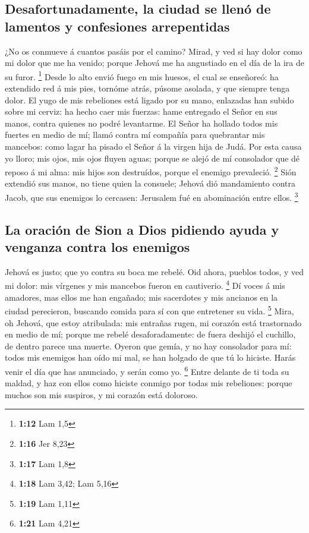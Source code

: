 \hypertarget{desafortunadamente-la-ciudad-se-llenuxf3-de-lamentos-y-confesiones-arrepentidas}{%
\subsection{Desafortunadamente, la ciudad se llenó de lamentos y
confesiones
arrepentidas}\label{desafortunadamente-la-ciudad-se-llenuxf3-de-lamentos-y-confesiones-arrepentidas}}

 ¿No os conmueve á cuantos pasáis por el camino? Mirad, y
ved si hay dolor como mi dolor que me ha venido; porque Jehová me ha
angustiado en el día de la ira de su furor. \footnote{\textbf{1:12} Lam
  1,5}  Desde lo alto envió fuego en mis huesos, el cual se
enseñoreó: ha extendido red á mis pies, tornóme atrás, púsome asolada, y
que siempre tenga dolor.  El yugo de mis rebeliones está
ligado por su mano, enlazadas han subido sobre mi cerviz: ha hecho caer
mis fuerzas: hame entregado el Señor en sus manos, contra quienes no
podré levantarme.  El Señor ha hollado todos mis fuertes en
medio de mí; llamó contra mí compañía para quebrantar mis mancebos: como
lagar ha pisado el Señor á la virgen hija de Judá.  Por
esta causa yo lloro; mis ojos, mis ojos fluyen aguas; porque se alejó de
mí consolador que dé reposo á mi alma: mis hijos son destruídos, porque
el enemigo prevaleció. \footnote{\textbf{1:16} Jer 8,23} 
Sión extendió sus manos, no tiene quien la consuele; Jehová dió
mandamiento contra Jacob, que sus enemigos lo cercasen: Jerusalem fué en
abominación entre ellos. \footnote{\textbf{1:17} Lam 1,8}

\hypertarget{la-oraciuxf3n-de-sion-a-dios-pidiendo-ayuda-y-venganza-contra-los-enemigos}{%
\subsection{La oración de Sion a Dios pidiendo ayuda y venganza contra
los
enemigos}\label{la-oraciuxf3n-de-sion-a-dios-pidiendo-ayuda-y-venganza-contra-los-enemigos}}

 Jehová es justo; que yo contra su boca me rebelé. Oid
ahora, pueblos todos, y ved mi dolor: mis vírgenes y mis mancebos fueron
en cautiverio. \footnote{\textbf{1:18} Lam 3,42; Lam 5,16} 
Dí voces á mis amadores, mas ellos me han engañado; mis sacerdotes y mis
ancianos en la ciudad perecieron, buscando comida para sí con que
entretener su vida. \footnote{\textbf{1:19} Lam 1,11} 
Mira, oh Jehová, que estoy atribulada: mis entrañas rugen, mi corazón
está trastornado en medio de mí; porque me rebelé desaforadamente: de
fuera deshijó el cuchillo, de dentro parece una muerte. 
Oyeron que gemía, y no hay consolador para mí: todos mis enemigos han
oído mi mal, se han holgado de que tú lo hiciste. Harás venir el día que
has anunciado, y serán como yo. \footnote{\textbf{1:21} Lam 4,21}
 Entre delante de ti toda su maldad, y haz con ellos como
hiciste conmigo por todas mis rebeliones: porque muchos son mis
suspiros, y mi corazón está doloroso.


